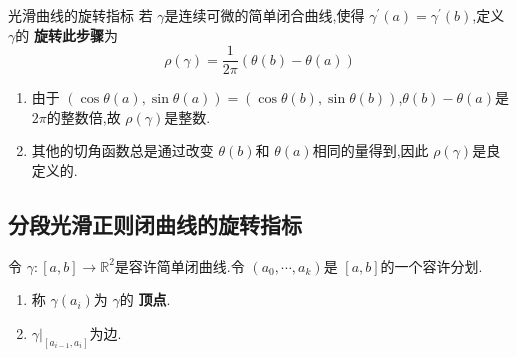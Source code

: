 \documentclass[../../几何与拓扑.tex]{subfiles}
\begin{document}
\begin{definition}{光滑曲线的旋转指标}
    若 \(   \gamma   \)是连续可微的简单闭合曲线,使得 \(   \gamma ^{\prime} \left( a \right)=  \gamma ^{\prime} \left( b \right)    \),定义 \(   \gamma   \)的 \textbf{旋转此步骤}为 \[
    \rho \left(  \gamma  \right)= \frac{1}{2\pi }\left(  \theta \left( b \right)- \theta \left( a \right)   \right)  
    \]   
\end{definition}
\begin{remark}
    \begin{enumerate}
        \item 由于 \(  \left( \cos  \theta \left( a \right),\sin  \theta \left( a \right)   \right)= \left( \cos  \theta \left( b \right),\sin  \theta \left( b \right)   \right)    \),\(   \theta \left( b \right)- \theta \left( a \right)    \)是 \(  2\pi   \)的整数倍,故 \(  \rho \left(  \gamma  \right)   \)是整数.
        \item 其他的切角函数总是通过改变 \(   \theta \left( b \right)   \)和 \(   \theta \left( a \right)   \)相同的量得到,因此 \(  \rho \left(  \gamma  \right)   \)是良定义的.       
    \end{enumerate}
    
\end{remark}

\subsection{分段光滑正则闭曲线的旋转指标}

\begin{definition}
    令 \(   \gamma :\left[ a,b \right]\to \mathbb{R} ^{2}   \)是容许简单闭曲线.令 \(  \left(  a_0,\cdots,a_{k}    \right)   \)是 \(  \left[ a,b \right]   \)的一个容许分划.
    
    \begin{enumerate}
        \item 称  \(   \gamma \left( a_{i} \right)   \)为 \(   \gamma   \)的 \textbf{顶点}.
        \item \(   \gamma |_{\left[ a_{i-1},a_{i} \right] }  \)为边.   
    \end{enumerate}
    
\end{definition}
\end{document}
